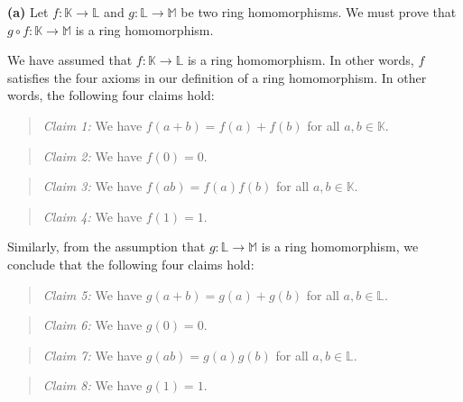 \documentclass[paper=a4, fontsize=12pt]{scrartcl}%
\theoremstyle{plainsl}
\theoremstyle{definition}
\theoremstyle{remark}
\newenvironment{statement}{\begin{quote}}{\end{quote}}
\begin{document}
\textbf{(a)} Let $f:\mathbb{K}\rightarrow\mathbb{L}$ and $g:\mathbb{L}%
\rightarrow\mathbb{M}$ be two ring homomorphisms. We must prove that $g\circ
f:\mathbb{K}\rightarrow\mathbb{M}$ is a ring homomorphism.

We have assumed that $f:\mathbb{K}\rightarrow\mathbb{L}$ is a ring
homomorphism. In other words, $f$ satisfies the four axioms in our definition
of a ring homomorphism. In other words, the following four claims hold:

\begin{statement}
\textit{Claim 1:} We have $f\left(  a+b\right)  =f\left(  a\right)  +f\left(
b\right)  $ for all $a,b\in\mathbb{K}$.
\end{statement}

\begin{statement}
\textit{Claim 2:} We have $f\left(  0\right)  =0$.
\end{statement}

\begin{statement}
\textit{Claim 3:} We have $f\left(  ab\right)  =f\left(  a\right)  f\left(
b\right)  $ for all $a,b\in\mathbb{K}$.
\end{statement}

\begin{statement}
\textit{Claim 4:} We have $f\left(  1\right)  =1$.
\end{statement}

Similarly, from the assumption that $g:\mathbb{L}\rightarrow\mathbb{M}$ is a
ring homomorphism, we conclude that the following four claims hold:

\begin{statement}
\textit{Claim 5:} We have $g\left(  a+b\right)  =g\left(  a\right)  +g\left(
b\right)  $ for all $a,b\in\mathbb{L}$.
\end{statement}

\begin{statement}
\textit{Claim 6:} We have $g\left(  0\right)  =0$.
\end{statement}

\begin{statement}
\textit{Claim 7:} We have $g\left(  ab\right)  =g\left(  a\right)  g\left(
b\right)  $ for all $a,b\in\mathbb{L}$.
\end{statement}

\begin{statement}
\textit{Claim 8:} We have $g\left(  1\right)  =1$.
\end{statement}
\end{document}
